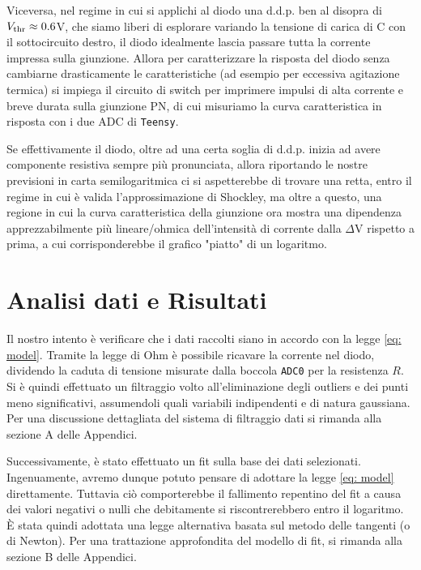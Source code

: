 \documentclass{article}[a4paper, oneside, 11pt]
\begin{document}
Viceversa, nel regime in cui si applichi al diodo una d.d.p. ben al disopra di
$V_{\rm thr} \approx 0.6 $V, che siamo liberi di esplorare variando la tensione
di carica di C con il sottocircuito destro, il diodo idealmente lascia passare
tutta la corrente impressa sulla giunzione. Allora per caratterizzare la
risposta del diodo senza cambiarne drasticamente le caratteristiche (ad esempio
per eccessiva agitazione termica) si impiega il circuito di switch per
imprimere impulsi di alta corrente e breve durata sulla giunzione PN, di cui
misuriamo la curva caratteristica in risposta con i due ADC di \verb+Teensy+.

Se effettivamente il diodo, oltre ad una certa soglia di d.d.p. inizia ad avere
componente resistiva sempre più pronunciata, allora riportando le nostre
previsioni in carta semilogaritmica ci si aspetterebbe di trovare una retta,
entro il regime in cui è valida l'approssimazione di Shockley, ma oltre a
questo, una regione in cui la curva caratteristica della giunzione ora mostra
una dipendenza apprezzabilmente più lineare/ohmica dell'intensità di corrente
dalla $\Delta$V rispetto a prima, a cui corrisponderebbe il grafico "piatto"
di un logaritmo.  

\section{Analisi dati e Risultati}
Il nostro intento è verificare che i dati raccolti siano in accordo con la
legge \eqref{eq: model}. Tramite la legge di Ohm è possibile ricavare la
corrente nel diodo, dividendo la caduta di tensione misurate dalla boccola
\verb'ADC0' per la resistenza $R$. Si è quindi effettuato un filtraggio volto
all'eliminazione degli outliers e dei punti meno significativi, assumendoli quali
variabili indipendenti e di natura gaussiana. Per una discussione dettagliata
del sistema di filtraggio dati si rimanda alla sezione A delle Appendici.

Successivamente, è stato effettuato un fit sulla base dei dati selezionati.
Ingenuamente, avremo dunque potuto pensare di adottare la legge 
\eqref{eq: model} direttamente. Tuttavia ciò comporterebbe il fallimento
repentino del fit a causa dei valori negativi o nulli che debitamente si
riscontrerebbero entro il logaritmo. \`E stata quindi adottata una legge
alternativa basata sul metodo delle tangenti (o di Newton). Per una trattazione
approfondita del modello di fit, si rimanda alla sezione B delle Appendici.
\end{document}

